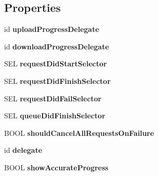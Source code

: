 \subsection*{Properties}
\begin{DoxyCompactItemize}
\item 
\hypertarget{interface_a_s_i_network_queue_ab7fe37cc9051ccd13ab3aeef7e8d6479}{
id {\bfseries uploadProgressDelegate}}
\label{interface_a_s_i_network_queue_ab7fe37cc9051ccd13ab3aeef7e8d6479}

\item 
\hypertarget{interface_a_s_i_network_queue_a96c9d1d79946b7b579ee8a927298e5f0}{
id {\bfseries downloadProgressDelegate}}
\label{interface_a_s_i_network_queue_a96c9d1d79946b7b579ee8a927298e5f0}

\item 
\hypertarget{interface_a_s_i_network_queue_ad6553f286d940f1652d5ba4ac0fa555e}{
SEL {\bfseries requestDidStartSelector}}
\label{interface_a_s_i_network_queue_ad6553f286d940f1652d5ba4ac0fa555e}

\item 
\hypertarget{interface_a_s_i_network_queue_ac8b9b906deaecd8a59d370d88129b3ad}{
SEL {\bfseries requestDidFinishSelector}}
\label{interface_a_s_i_network_queue_ac8b9b906deaecd8a59d370d88129b3ad}

\item 
\hypertarget{interface_a_s_i_network_queue_a958b009cbd9758186f6ee80e1f9e8192}{
SEL {\bfseries requestDidFailSelector}}
\label{interface_a_s_i_network_queue_a958b009cbd9758186f6ee80e1f9e8192}

\item 
\hypertarget{interface_a_s_i_network_queue_a6ccfadf78ae1de4c5d339a5abfc30b53}{
SEL {\bfseries queueDidFinishSelector}}
\label{interface_a_s_i_network_queue_a6ccfadf78ae1de4c5d339a5abfc30b53}

\item 
\hypertarget{interface_a_s_i_network_queue_a34b187d9867b55c8444abc6cd6bee2ca}{
BOOL {\bfseries shouldCancelAllRequestsOnFailure}}
\label{interface_a_s_i_network_queue_a34b187d9867b55c8444abc6cd6bee2ca}

\item 
\hypertarget{interface_a_s_i_network_queue_a20889184e5301a72c4be48f7fe64c07f}{
id {\bfseries delegate}}
\label{interface_a_s_i_network_queue_a20889184e5301a72c4be48f7fe64c07f}

\item 
\hypertarget{interface_a_s_i_network_queue_ae23ba0c50fb37d69b439d089dacd93cd}{
BOOL {\bfseries showAccurateProgress}}
\label{interface_a_s_i_network_queue_ae23ba0c50fb37d69b439d089dacd93cd}


\end{DoxyCompactItemize}
